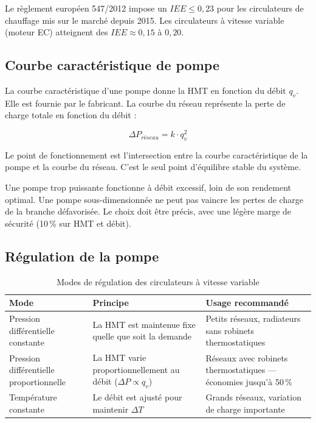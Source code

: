 \begin{definition}[title=Indice d'efficacité énergétique (IEE)]
Le règlement européen 547/2012 impose un $IEE \leq 0{,}23$ pour les circulateurs de chauffage mis sur le marché depuis 2015. Les circulateurs à vitesse variable (moteur EC) atteignent des $IEE \approx 0{,}15$ à $0{,}20$.
\end{definition}

\subsection{Courbe caractéristique de pompe}

La courbe caractéristique d'une pompe donne la HMT en fonction du débit $q_v$. Elle est fournie par le fabricant. La courbe du réseau représente la perte de charge totale en fonction du débit :

\begin{equation}
  \Delta P_{réseau} = k \cdot q_v^2
\end{equation}

\begin{definition}[title=Point de fonctionnement]
Le point de fonctionnement est l'intersection entre la courbe caractéristique de la pompe et la courbe du réseau. C'est le seul point d'équilibre stable du système.
\end{definition}

\begin{attention}
Une pompe trop puissante fonctionne à débit excessif, loin de son rendement optimal. Une pompe sous-dimensionnée ne peut pas vaincre les pertes de charge de la branche défavorisée. Le choix doit être précis, avec une légère marge de sécurité (10\,\% sur HMT et débit).
\end{attention}

\subsection{Régulation de la pompe}

\begin{table}[H]
  \centering
  \caption{Modes de régulation des circulateurs à vitesse variable}
  \begin{tabular}{p{3.5cm}p{4cm}p{4.5cm}}
    \toprule
    Mode & Principe & Usage recommandé \\
    \midrule
    Pression différentielle constante & La HMT est maintenue fixe quelle que soit la demande & Petits réseaux, radiateurs sans robinets thermostatiques \\
    Pression différentielle proportionnelle & La HMT varie proportionnellement au débit ($\Delta P \propto q_v$) & Réseaux avec robinets thermostatiques — économies jusqu'à 50\,\% \\
    Température constante & Le débit est ajusté pour maintenir $\Delta T$ & Grands réseaux, variation de charge importante \\
    \bottomrule
  \end{tabular}
\end{table}

